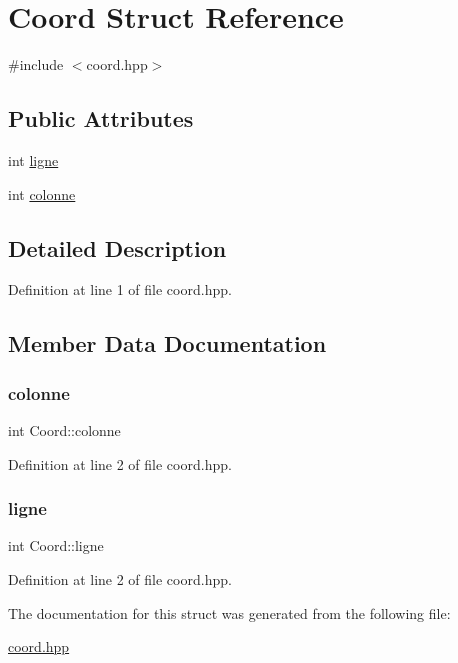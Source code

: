 \hypertarget{structCoord}{}\section{Coord Struct Reference}
\label{structCoord}


{\ttfamily \#include $<$coord.\+hpp$>$}

\subsection*{Public Attributes}
\begin{DoxyCompactItemize}
\item 
int \hyperlink{structCoord_ad529bf9cab7eb3301af9a721f2fbb606}{ligne}
\item 
int \hyperlink{structCoord_ad1c31b89b9a725fb9f5f86eed76f7ee7}{colonne}
\end{DoxyCompactItemize}


\subsection{Detailed Description}


Definition at line 1 of file coord.\+hpp.



\subsection{Member Data Documentation}
\mbox{\label{structCoord_ad1c31b89b9a725fb9f5f86eed76f7ee7}} 
\subsubsection{\texorpdfstring{colonne}{colonne}}
{\footnotesize\ttfamily int Coord\+::colonne}



Definition at line 2 of file coord.\+hpp.

\mbox{\label{structCoord_ad529bf9cab7eb3301af9a721f2fbb606}} 
\subsubsection{\texorpdfstring{ligne}{ligne}}
{\footnotesize\ttfamily int Coord\+::ligne}



Definition at line 2 of file coord.\+hpp.



The documentation for this struct was generated from the following file\+:\begin{DoxyCompactItemize}
\item 
\hyperlink{coord_8hpp}{coord.\+hpp}\end{DoxyCompactItemize}
